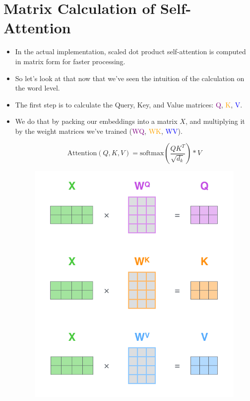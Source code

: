 \section{Matrix Calculation of Self-Attention}
\begin{itemize}

\item  In the actual implementation, scaled dot product self-attention is computed in matrix form for faster processing.
\item So let’s look at that now that we’ve seen the intuition of the calculation on the word level.

\item The first step is to calculate the Query, Key, and Value matrices: \textcolor{purple}{Q}, \textcolor{orange}{K}, \textcolor{blue}{V}.

\item We do that by packing our embeddings into a matrix $X$, and multiplying it by the weight matrices we’ve trained (\textcolor{purple}{WQ}, \textcolor{orange}{WK}, \textcolor{blue}{WV}).


 \begin{displaymath}
  \text{Attention}(Q,K,V) = \text{softmax}\left(\frac{QK^T}{\sqrt{d_k}}\right)*V
 \end{displaymath}


\begin{figure}[h]
        	\includegraphics[scale = 0.25]{pics/self-attention-matrix-calculation.png}
        \end{figure} 


\end{itemize}
